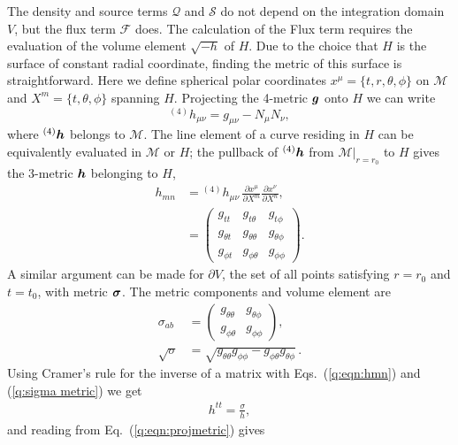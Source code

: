 The density and source terms $\mathcal{Q}$ and $\mathcal{S}$ do not depend on the integration domain $V$, but the flux term $\mathcal{F}$ does. The calculation of the Flux term requires the evaluation of the volume element $\sqrt{-h}$ of $H$. Due to the choice that $H$ is the surface of constant radial coordinate, finding the metric of this surface is straightforward. Here we define spherical polar coordinates $x^\mu = \{t,r,\theta, \phi \}$ on $\mathcal{M}$ and $X^m = \{t,\theta, \phi \}$ spanning $H$. Projecting the 4-metric $\boldsymbol g$ onto $H$ we can write
\begin{equation}
\label{q:eqn:projmetric}{}^{(4)}h_{\mu\nu} = g_{\mu\nu}-N_\mu N_\nu,
\end{equation}
where ${}^{(4)}\boldsymbol{h}$ belongs to $\mathcal{M}$. The line element of a curve residing in $H$ can be equivalently evaluated in $\mathcal{M}$ or $H$; the pullback of ${}^{(4)}\boldsymbol{h}$ from $\mathcal{M}\vert_{r=r_0}$ to $H$ gives the 3-metric $\boldsymbol h$ belonging to $H$,
\begin{align}
\label{q:induced_metric}h_{mn}  &= {}^{(4)}h_{\mu\nu}\,\frac{\partial x^\mu}{\partial X^m} \frac{\partial x^\nu}{\partial X^n}, \\
 \label{q:eqn:hmn}&= \begin{pmatrix} g_{tt} & g_{t\theta} & g_{t\phi} \\ g_{\theta t} &  g_{\theta\theta}& g_{\theta\phi} \\ g_{\phi t} & g_{\phi\theta} & g_{\phi\phi} \end{pmatrix}.
\end{align}
A similar argument can be made for $\partial V$, the set of all points satisfying $r=r_0$ and $t=t_0$, with metric $\boldsymbol{\sigma}$. The metric components and volume element are
\begin{align}
\label{q:sigma metric}\sigma_{ab} &= \begin{pmatrix} g_{\theta\theta} & g_{\theta\phi} \\ g_{\phi\theta} & g_{\phi\phi} \end{pmatrix}, \\
\label{q:sigma det}\sqrt{\sigma}  &= \sqrt{g_{\theta\theta}g_{\phi\phi} - g_{\phi\theta}g_{\theta\phi}}\,.
\end{align}
Using Cramer's rule for the inverse of a matrix with Eqs.~(\ref{q:eqn:hmn}) and (\ref{q:sigma metric}) we get
\begin{align}
\label{q:eqn:htt}h^{tt} = \frac{{\sigma}}{h},
\end{align}
and reading from Eq.~(\ref{q:eqn:projmetric}) gives
